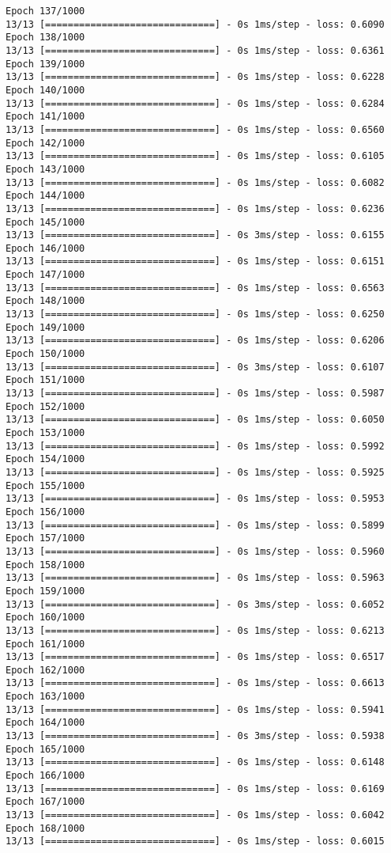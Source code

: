\documentclass[11pt]{article}
\begin{document}
\begin{Verbatim}[commandchars=\\\{\}]
Epoch 137/1000
13/13 [==============================] - 0s 1ms/step - loss: 0.6090
Epoch 138/1000
13/13 [==============================] - 0s 1ms/step - loss: 0.6361
Epoch 139/1000
13/13 [==============================] - 0s 1ms/step - loss: 0.6228
Epoch 140/1000
13/13 [==============================] - 0s 1ms/step - loss: 0.6284
Epoch 141/1000
13/13 [==============================] - 0s 1ms/step - loss: 0.6560
Epoch 142/1000
13/13 [==============================] - 0s 1ms/step - loss: 0.6105
Epoch 143/1000
13/13 [==============================] - 0s 1ms/step - loss: 0.6082
Epoch 144/1000
13/13 [==============================] - 0s 1ms/step - loss: 0.6236
Epoch 145/1000
13/13 [==============================] - 0s 3ms/step - loss: 0.6155
Epoch 146/1000
13/13 [==============================] - 0s 1ms/step - loss: 0.6151
Epoch 147/1000
13/13 [==============================] - 0s 1ms/step - loss: 0.6563
Epoch 148/1000
13/13 [==============================] - 0s 1ms/step - loss: 0.6250
Epoch 149/1000
13/13 [==============================] - 0s 1ms/step - loss: 0.6206
Epoch 150/1000
13/13 [==============================] - 0s 3ms/step - loss: 0.6107
Epoch 151/1000
13/13 [==============================] - 0s 1ms/step - loss: 0.5987
Epoch 152/1000
13/13 [==============================] - 0s 1ms/step - loss: 0.6050
Epoch 153/1000
13/13 [==============================] - 0s 1ms/step - loss: 0.5992
Epoch 154/1000
13/13 [==============================] - 0s 1ms/step - loss: 0.5925
Epoch 155/1000
13/13 [==============================] - 0s 1ms/step - loss: 0.5953
Epoch 156/1000
13/13 [==============================] - 0s 1ms/step - loss: 0.5899
Epoch 157/1000
13/13 [==============================] - 0s 1ms/step - loss: 0.5960
Epoch 158/1000
13/13 [==============================] - 0s 1ms/step - loss: 0.5963
Epoch 159/1000
13/13 [==============================] - 0s 3ms/step - loss: 0.6052
Epoch 160/1000
13/13 [==============================] - 0s 1ms/step - loss: 0.6213
Epoch 161/1000
13/13 [==============================] - 0s 1ms/step - loss: 0.6517
Epoch 162/1000
13/13 [==============================] - 0s 1ms/step - loss: 0.6613
Epoch 163/1000
13/13 [==============================] - 0s 1ms/step - loss: 0.5941
Epoch 164/1000
13/13 [==============================] - 0s 3ms/step - loss: 0.5938
Epoch 165/1000
13/13 [==============================] - 0s 1ms/step - loss: 0.6148
Epoch 166/1000
13/13 [==============================] - 0s 1ms/step - loss: 0.6169
Epoch 167/1000
13/13 [==============================] - 0s 1ms/step - loss: 0.6042
Epoch 168/1000
13/13 [==============================] - 0s 1ms/step - loss: 0.6015

\end{Verbatim}
\end{document}
